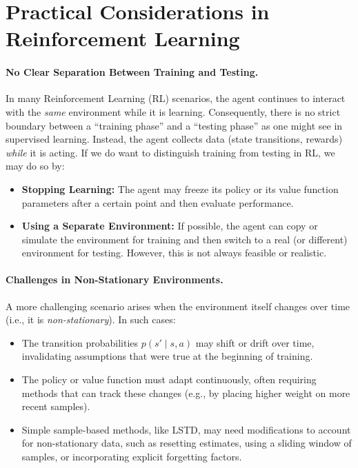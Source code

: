 \section{Practical Considerations in Reinforcement Learning}

\paragraph{No Clear Separation Between Training and Testing.}
In many Reinforcement Learning (RL) scenarios, the agent continues to interact with the \emph{same} environment while it is learning. Consequently, there is no strict boundary between a ``training phase'' and a ``testing phase'' as one might see in supervised learning. Instead, the agent collects data (state transitions, rewards) \emph{while} it is acting. If we do want to distinguish training from testing in RL, we may do so by:
\begin{itemize}
    \item \textbf{Stopping Learning:} The agent may freeze its policy or its value function parameters after a certain point and then evaluate performance.
    \item \textbf{Using a Separate Environment:} If possible, the agent can copy or simulate the environment for training and then switch to a real (or different) environment for testing. However, this is not always feasible or realistic.
\end{itemize}

\paragraph{Challenges in Non-Stationary Environments.}
A more challenging scenario arises when the environment itself changes over time (i.e., it is \emph{non-stationary}). In such cases:
\begin{itemize}
    \item The transition probabilities $p(s' \mid s, a)$ may shift or drift over time, invalidating assumptions that were true at the beginning of training.
    \item The policy or value function must adapt continuously, often requiring methods that can track these changes (e.g., by placing higher weight on more recent samples).
    \item Simple sample-based methods, like LSTD, may need modifications to account for non-stationary data, such as resetting estimates, using a sliding window of samples, or incorporating explicit forgetting factors.
\end{itemize}

